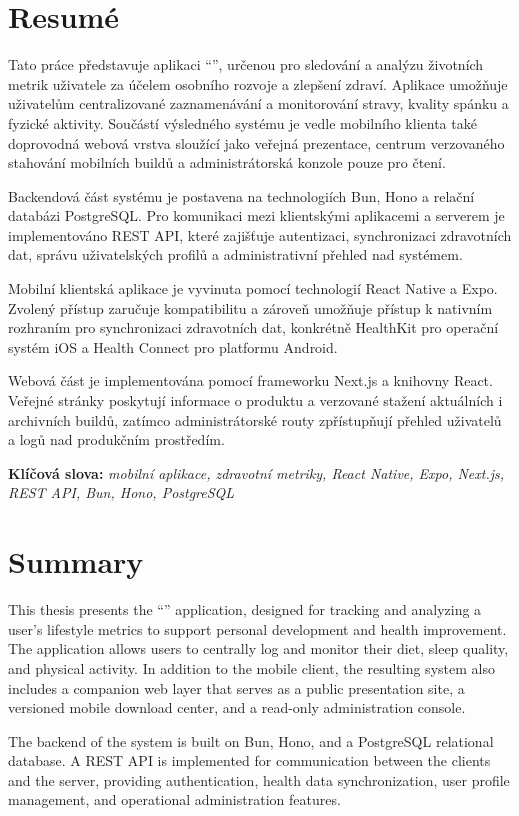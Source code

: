 \section*{Resumé}
Tato práce představuje aplikaci \enquote{\docTitle}, určenou pro sledování a analýzu životních metrik uživatele za účelem osobního rozvoje a zlepšení zdraví. Aplikace umožňuje uživatelům centralizované zaznamenávání a monitorování stravy, kvality spánku a fyzické aktivity. Součástí výsledného systému je vedle mobilního klienta také doprovodná webová vrstva sloužící jako veřejná prezentace, centrum verzovaného stahování mobilních buildů a administrátorská konzole pouze pro čtení.

Backendová část systému je postavena na technologiích Bun, Hono a relační databázi PostgreSQL. Pro komunikaci mezi klientskými aplikacemi a serverem je implementováno REST API, které zajišťuje autentizaci, synchronizaci zdravotních dat, správu uživatelských profilů a administrativní přehled nad systémem.

Mobilní klientská aplikace je vyvinuta pomocí technologií React Native a Expo. Zvolený přístup zaručuje kompatibilitu a zároveň umožňuje přístup k nativním rozhraním pro synchronizaci zdravotních dat, konkrétně HealthKit pro operační systém iOS a Health Connect pro platformu Android.

Webová část je implementována pomocí frameworku Next.js a knihovny React. Veřejné stránky poskytují informace o produktu a verzované stažení aktuálních i archivních buildů, zatímco administrátorské routy zpřístupňují přehled uživatelů a logů nad produkčním prostředím.

\bigskip
\noindent\textbf{Klíčová slova:}
\textit{mobilní aplikace, zdravotní metriky, React Native, Expo, Next.js, REST API, Bun, Hono, PostgreSQL}

\section*{Summary}
This thesis presents the \enquote{\docTitle} application, designed for tracking and analyzing a user's lifestyle metrics to support personal development and health improvement. The application allows users to centrally log and monitor their diet, sleep quality, and physical activity. In addition to the mobile client, the resulting system also includes a companion web layer that serves as a public presentation site, a versioned mobile download center, and a read-only administration console.

The backend of the system is built on Bun, Hono, and a PostgreSQL relational database. A REST API is implemented for communication between the clients and the server, providing authentication, health data synchronization, user profile management, and operational administration features.

